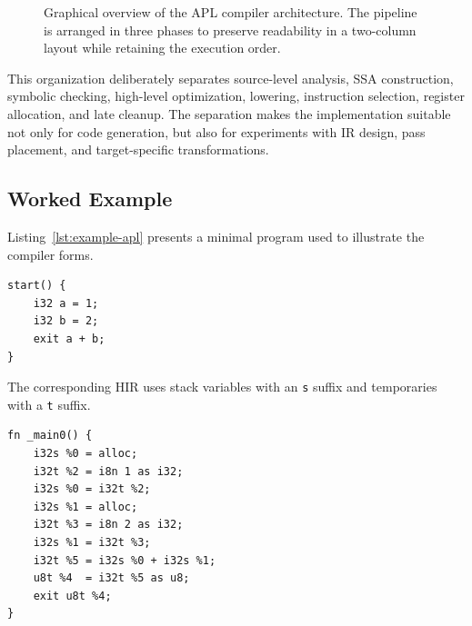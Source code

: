\documentclass[10pt,twocolumn]{article}
\begin{document}
\begin{figure}[t]
{%
}
\caption{Graphical overview of the APL compiler architecture. The pipeline is arranged in three phases to preserve readability in a two-column layout while retaining the execution order.}
\label{fig:compiler-pipeline}
\end{figure}

\par This organization deliberately separates source-level analysis, SSA construction, symbolic checking, high-level optimization, lowering, instruction selection, register allocation, and late cleanup. The separation makes the implementation suitable not only for code generation, but also for experiments with IR design, pass placement, and target-specific transformations.

\subsection{Worked Example}

\par Listing~\ref{lst:example-apl} presents a minimal program used to illustrate the compiler forms.

\begin{lstlisting}[language=APL,caption={Input APL program.},label={lst:example-apl}]
start() {
    i32 a = 1;
    i32 b = 2;
    exit a + b;
}
\end{lstlisting}

\par The corresponding HIR uses stack variables with an \texttt{s} suffix and temporaries with a \texttt{t} suffix.

\begin{lstlisting}[caption={High IR (HIR) form for Listing~\ref{lst:example-apl}.}]
fn _main0() {
    i32s %0 = alloc;
    i32t %2 = i8n 1 as i32;
    i32s %0 = i32t %2;
    i32s %1 = alloc;
    i32t %3 = i8n 2 as i32;
    i32s %1 = i32t %3;
    i32t %5 = i32s %0 + i32s %1;
    u8t %4  = i32t %5 as u8;
    exit u8t %4;
}
\end{lstlisting}
\end{document}
